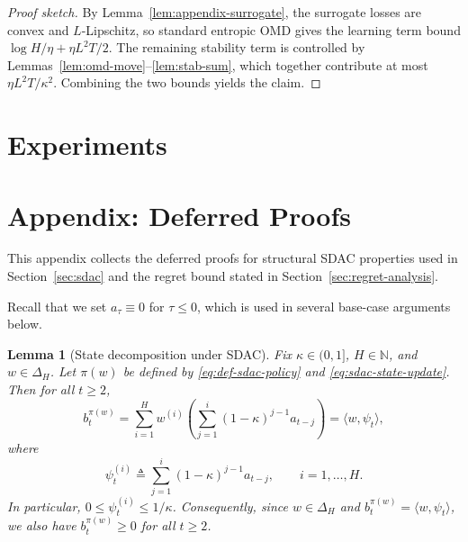 \documentclass[11pt]{article}
\newtheorem{lemma}{Lemma}
\begin{document}
\begin{proof}[Proof sketch]
By Lemma~\ref{lem:appendix-surrogate}, the surrogate losses are convex and \(L\)-Lipschitz, so standard entropic OMD gives the learning term bound \(\log H/\eta + \eta L^2T/2\).
The remaining stability term is controlled by Lemmas~\ref{lem:omd-move}--\ref{lem:stab-sum}, which together contribute at most \(\eta L^2T/\kappa^2\). Combining the two bounds yields the claim.
\end{proof}


\section{Experiments}
\label{sec:experiments}


\appendix
\section{Appendix: Deferred Proofs}
\label{sec:appendix-proofs}

This appendix collects the deferred proofs for structural SDAC properties used in Section~\ref{sec:sdac} and the regret bound stated in Section~\ref{sec:regret-analysis}.

Recall that we set $a_\tau\equiv 0$ for $\tau\le 0$, which is used in several base-case arguments below.

\begin{lemma}[State decomposition under SDAC]
\label{lem:appendix-state-decomp}
Fix $\kappa\in(0,1]$, $H\in\mathbb{N}$, and $w\in\Delta_H$. Let $\pi(w)$ be defined by \eqref{eq:def-sdac-policy} and \eqref{eq:sdac-state-update}. Then for all $t\ge 2$,
\begin{equation}
\label{eq:appendix-state-decomp}
b_t^{\pi(w)}
=
\sum_{i=1}^H w^{(i)}\!\left(\sum_{j=1}^{i}(1-\kappa)^{j-1}a_{t-j}\right)
= \langle w,\psi_t\rangle,
\end{equation}
where
\[
\psi_t^{(i)} \triangleq \sum_{j=1}^{i}(1-\kappa)^{j-1}a_{t-j}, \qquad i=1,\ldots,H.
\]
In particular, $0\le \psi_t^{(i)}\le 1/\kappa$. Consequently, since $w\in\Delta_H$ and
$b_t^{\pi(w)}=\langle w,\psi_t\rangle$, we also have $b_t^{\pi(w)}\ge 0$ for all $t\ge 2$.
\end{lemma}
\end{document}
